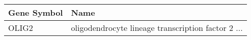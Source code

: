 \begin{tabular}{ll}
\toprule
Gene Symbol &                                               Name \\
\midrule
      OLIG2 & oligodendrocyte lineage transcription factor 2 ... \\
\bottomrule
\end{tabular}
